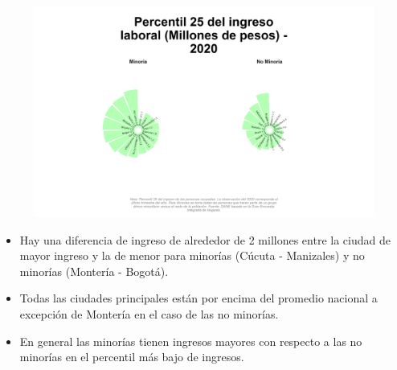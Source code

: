     \begin{figure}[H]
        \caption[Percentil 25 del ingreso laboral por ciudades principales para minorías - 2020]{\label{ingreso_laboral_25_ciudades_minorias} }
        \begin{center}
        \includegraphics[width=\textwidth,keepaspectratio]{img/var_1_static.png}
        \end{center}
    \end{figure}
            \begin{itemize}
                    \item Hay una diferencia de ingreso de alrededor de 2 millones entre la ciudad de mayor ingreso y la de menor para minorías (Cúcuta -  Manizales) y no minorías (Montería - Bogotá).
                    \item Todas las ciudades principales están por encima del promedio nacional a excepción de Montería en el caso de las no minorías.
                    \item En general las minorías tienen ingresos mayores con respecto a las no minorías en el percentil más bajo de ingresos.
                \end{itemize}

